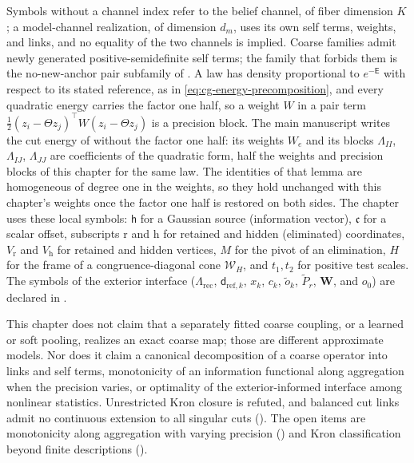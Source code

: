 Symbols without a channel index refer to the belief channel, of fiber
dimension \(K\); a model-channel realization, of dimension \(d_m\), uses its own
self terms, weights, and links, and no equality of the two channels is implied.
Coarse families admit newly generated positive-semidefinite self terms; the
family that forbids them is the no-new-anchor pair subfamily of
. A law has density proportional to
\(e^{-\mathsf E}\) with respect to its stated reference, as in
\eqref{eq:cg-energy-precomposition}, and every quadratic energy carries the
factor one half, so a weight \(W\) in a pair term
\(\tfrac12(z_i-\Theta z_j)^\top W(z_i-\Theta z_j)\) is a precision block. The
main manuscript writes the cut energy of 
without the factor one half: its weights \(W_e\) and its blocks
\(\Lambda_{II}\), \(\Lambda_{IJ}\), \(\Lambda_{JJ}\) are coefficients of the
quadratic form, half the weights and precision blocks of this chapter for the
same law. The identities of that lemma are homogeneous of degree one in the
weights, so they hold unchanged with this chapter's weights once the factor one
half is restored on both sides. The chapter uses these local symbols: \(\mathsf h\) for a
Gaussian source (information vector), \(\mathfrak c\) for a scalar offset,
subscripts \(\mathrm r\) and \(\mathrm h\) for retained and hidden (eliminated)
coordinates, \(V_{\mathrm r}\) and \(V_{\mathrm h}\) for retained and hidden
vertices, \(M\) for the pivot of an elimination, \(H\) for the frame of a
congruence-diagonal cone \(\mathcal W_H\), and \(t_1,t_2\) for positive test
scales. The symbols of the exterior interface (\(\Lambda_{\mathrm{rec}}\),
\(\mathsf d_{\mathrm{ref},k}\), \(x_k\), \(c_k\), \(\tilde o_k\),
\(\widetilde P_r\), \(\mathbf W\), and \(o_0\)) are declared in
.

This chapter does not claim that a separately fitted coarse coupling, or a
learned or soft pooling, realizes an exact coarse map; those are different
approximate models. Nor does it claim a canonical decomposition of a coarse
operator into links and self terms, monotonicity of an information
functional along aggregation when the precision varies, or optimality of the
exterior-informed interface among nonlinear statistics. Unrestricted Kron
closure is refuted, and balanced cut links admit no continuous extension to all singular cuts
(). The open items are monotonicity along aggregation with
varying precision () and Kron
classification beyond finite descriptions
(). 


